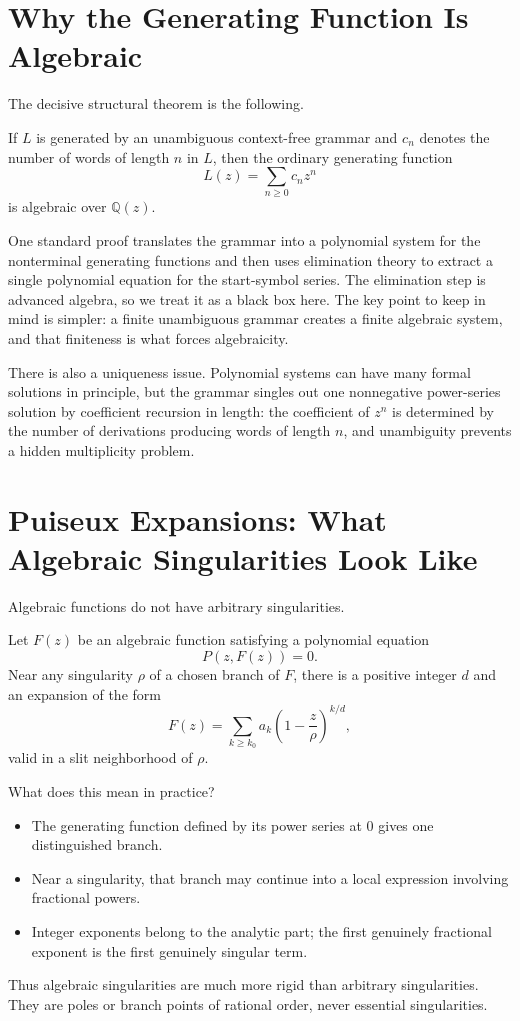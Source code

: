 \section{Why the Generating Function Is Algebraic}

The decisive structural theorem is the following.

\begin{theorem}
If $L$ is generated by an unambiguous context-free grammar and $c_n$ denotes the number of words of length $n$ in $L$, then the ordinary generating function
\[
  L(z) = \sum_{n \ge 0} c_n z^n
\]
is algebraic over $\mathbb{Q}(z)$.
\end{theorem}

One standard proof translates the grammar into a polynomial system for the nonterminal generating functions and then uses elimination theory to extract a single polynomial equation for the start-symbol series. The elimination step is advanced algebra, so we treat it as a black box here. The key point to keep in mind is simpler: a finite unambiguous grammar creates a finite algebraic system, and that finiteness is what forces algebraicity.

There is also a uniqueness issue. Polynomial systems can have many formal solutions in principle, but the grammar singles out one nonnegative power-series solution by coefficient recursion in length: the coefficient of $z^n$ is determined by the number of derivations producing words of length $n$, and unambiguity prevents a hidden multiplicity problem.

\section{Puiseux Expansions: What Algebraic Singularities Look Like}

Algebraic functions do not have arbitrary singularities.

\begin{theorem}
Let $F(z)$ be an algebraic function satisfying a polynomial equation
\[
  P(z,F(z)) = 0.
\]
Near any singularity $\rho$ of a chosen branch of $F$, there is a positive integer $d$ and an expansion of the form
\[
  F(z) = \sum_{k \ge k_0} a_k \left(1-\frac{z}{\rho}\right)^{k/d},
\]
valid in a slit neighborhood of $\rho$.
\end{theorem}

What does this mean in practice?
\begin{itemize}
  \item The generating function defined by its power series at $0$ gives one distinguished branch.
  \item Near a singularity, that branch may continue into a local expression involving fractional powers.
  \item Integer exponents belong to the analytic part; the first genuinely fractional exponent is the first genuinely singular term.
\end{itemize}
Thus algebraic singularities are much more rigid than arbitrary singularities. They are poles or branch points of rational order, never essential singularities.

